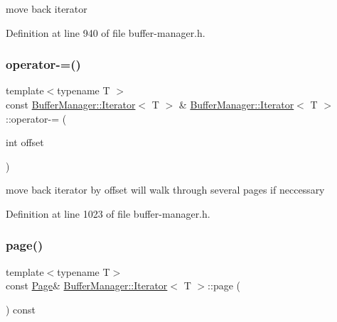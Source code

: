 move back iterator 

Definition at line 940 of file buffer-\/manager.\+h.

\mbox{\label{class_buffer_manager_1_1_iterator_a2a24e019d3a2934f3cd275b8a2436e59}} 
\subsubsection{\texorpdfstring{operator-\/=()}{operator-=()}}
{\footnotesize\ttfamily template$<$typename T $>$ \\
const \mbox{\hyperlink{class_buffer_manager_1_1_iterator}{Buffer\+Manager\+::\+Iterator}}$<$ T $>$ \& \mbox{\hyperlink{class_buffer_manager_1_1_iterator}{Buffer\+Manager\+::\+Iterator}}$<$ T $>$\+::operator-\/= (\begin{DoxyParamCaption}\item[{int}]{offset }\end{DoxyParamCaption})\hspace{0.3cm}{\ttfamily [inline]}}

move back iterator by offset will walk through several pages if neccessary 

Definition at line 1023 of file buffer-\/manager.\+h.

\mbox{\label{class_buffer_manager_1_1_iterator_a5a17d8377bc10f437e29b058c0376b15}} 
\subsubsection{\texorpdfstring{page()}{page()}}
{\footnotesize\ttfamily template$<$typename T$>$ \\
const \mbox{\hyperlink{struct_page}{Page}}\& \mbox{\hyperlink{class_buffer_manager_1_1_iterator}{Buffer\+Manager\+::\+Iterator}}$<$ T $>$\+::page (\begin{DoxyParamCaption}{ }\end{DoxyParamCaption}) const\hspace{0.3cm}{\ttfamily [inline]}}

